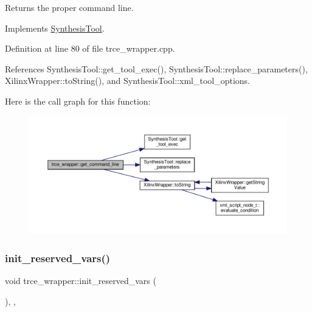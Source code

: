 Returns the proper command line. 



Implements \hyperlink{classSynthesisTool_a8eb2ef7a6230a997a2467d298613c045}{Synthesis\+Tool}.



Definition at line 80 of file trce\+\_\+wrapper.\+cpp.



References Synthesis\+Tool\+::get\+\_\+tool\+\_\+exec(), Synthesis\+Tool\+::replace\+\_\+parameters(), Xilinx\+Wrapper\+::to\+String(), and Synthesis\+Tool\+::xml\+\_\+tool\+\_\+options.

Here is the call graph for this function\+:
\nopagebreak
\begin{figure}[H]
\begin{center}
\leavevmode
\includegraphics[width=350pt]{dc/db5/classtrce__wrapper_a0ee76e5b1df405878bf02bc597513e23_cgraph}
\end{center}
\end{figure}
\mbox{\label{classtrce__wrapper_a2b7b95bfdd4395bcd8bfedabafbb071b}} 
\subsubsection{\texorpdfstring{init\+\_\+reserved\+\_\+vars()}{init\_reserved\_vars()}}
{\footnotesize\ttfamily void trce\+\_\+wrapper\+::init\+\_\+reserved\+\_\+vars (\begin{DoxyParamCaption}{ }\end{DoxyParamCaption})\hspace{0.3cm}{\ttfamily [override]}, {\ttfamily [protected]}, {\ttfamily [virtual]}}



